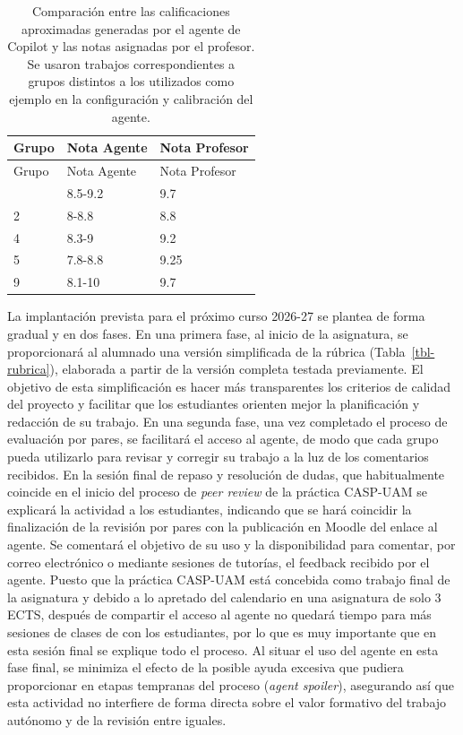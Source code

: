 \documentclass[
  11pt,
  a4paper,
  twoside]{scrreprt}
\begin{document}
\begin{longtable}[]{@{}lll@{}}
\caption{Comparación entre las calificaciones aproximadas generadas por
el agente de Copilot y las notas asignadas por el profesor. Se usaron
trabajos correspondientes a grupos distintos a los utilizados como
ejemplo en la configuración y calibración del
agente.}\label{tbl-notas}\tabularnewline
\toprule\noalign{}
Grupo & Nota Agente & Nota Profesor \\
\midrule\noalign{}
\endfirsthead
\toprule\noalign{}
Grupo & Nota Agente & Nota Profesor \\
\midrule\noalign{}
\endhead
\bottomrule\noalign{}
\endlastfoot
1 & 8.5-9.2 & 9.7 \\
2 & 8-8.8 & 8.8 \\
4 & 8.3-9 & 9.2 \\
5 & 7.8-8.8 & 9.25 \\
9 & 8.1-10 & 9.7 \\
\end{longtable}

La implantación prevista para el próximo curso 2026-27 se plantea de
forma gradual y en dos fases. En una primera fase, al inicio de la
asignatura, se proporcionará al alumnado una versión simplificada de la
rúbrica (Tabla~\ref{tbl-rubrica}), elaborada a partir de la versión
completa testada previamente. El objetivo de esta simplificación es
hacer más transparentes los criterios de calidad del proyecto y
facilitar que los estudiantes orienten mejor la planificación y
redacción de su trabajo. En una segunda fase, una vez completado el
proceso de evaluación por pares, se facilitará el acceso al agente, de
modo que cada grupo pueda utilizarlo para revisar y corregir su trabajo
a la luz de los comentarios recibidos. En la sesión final de repaso y
resolución de dudas, que habitualmente coincide en el inicio del proceso
de \emph{peer review} de la práctica CASP-UAM se explicará la actividad
a los estudiantes, indicando que se hará coincidir la finalización de la
revisión por pares con la publicación en Moodle del enlace al agente. Se
comentará el objetivo de su uso y la disponibilidad para comentar, por
correo electrónico o mediante sesiones de tutorías, el feedback recibido
por el agente. Puesto que la práctica CASP-UAM está concebida como
trabajo final de la asignatura y debido a lo apretado del calendario en
una asignatura de solo 3 ECTS, después de compartir el acceso al agente
no quedará tiempo para más sesiones de clases de con los estudiantes,
por lo que es muy importante que en esta sesión final se explique todo
el proceso. Al situar el uso del agente en esta fase final, se minimiza
el efecto de la posible ayuda excesiva que pudiera proporcionar en
etapas tempranas del proceso (\emph{agent spoiler}), asegurando así que
esta actividad no interfiere de forma directa sobre el valor formativo
del trabajo autónomo y de la revisión entre iguales.
\end{document}
